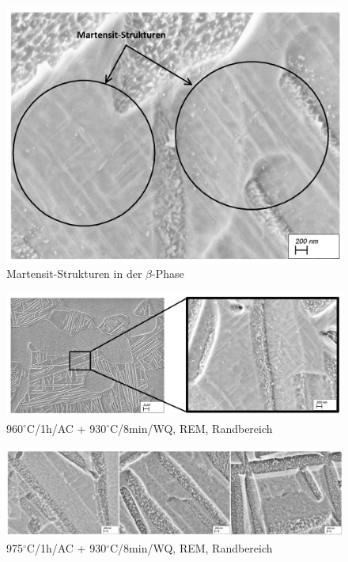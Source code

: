 \begin{figure}
	\centering
	\includegraphics[width=0.8\linewidth]{./Bilder/Abbildung 21.png}
	\caption[Abbildung]{Martensit-Strukturen in der $\beta$-Phase}
	\label{fig:abbildung-21}
\end{figure}

\begin{figure}
	\centering
	\includegraphics[width=1.0\linewidth]{./Bilder/Abbildung 10.png}
	\caption[Abbildung 10]{960$^\circ$C/1h/AC + 930$^\circ$C/8min/WQ, REM, Randbereich}
	\label{fig:abbildung-10}
\end{figure}

\begin{figure}
	\centering
	\includegraphics[width=1.0\linewidth]{./Bilder/Abbildung 11.png}
	\caption[Abbildung 11]{975$^\circ$C/1h/AC + 930$^\circ$C/8min/WQ, REM, Randbereich}
	\label{fig:abbildung-11}
\end{figure}

